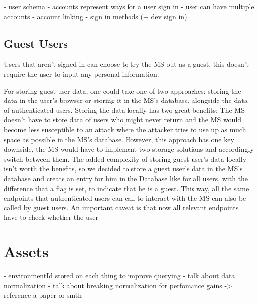 

- user schema
- accounts represent ways for a user sign in
- user can have multiple accounts
- account linking
- sign in methods (+ dev sign in)




\subsection{Guest Users}

Users that aren't signed in can choose to try the MS out as a guest, this doesn't require
the user to input any personal information.

For storing guest user data, one could take one of two approaches:
storing the data in the user's browser or storing it in the MS's database, alongside the
data of authenticated users.
Storing the data locally has two great benefits: 
The MS doesn't have to store data of users who might never return and
the MS would become less susceptible to an attack where the attacker tries to use up as
much space as possible in the MS's database.
However, this approach has one key downside, the MS would have to implement two storage
solutions and accordingly switch between them.
The added complexity of storing guest user's data locally isn't worth the benefits, so we
decided to store a guest user's data in the MS's database and create an entry for him in
the Database like for all users, with the difference that a flag is set, to indicate that
he is a guest.
This way, all the same endpoints that authenticated users can call to interact with the MS
can also be called by guest users.
An important caveat is that now all relevant endpoints have to check whether the user 


\section{Assets}

- environmentId stored on each thing to improve querying
- talk about data normalization
- talk about breaking normalization for perfomance gains -> reference a paper or smth


